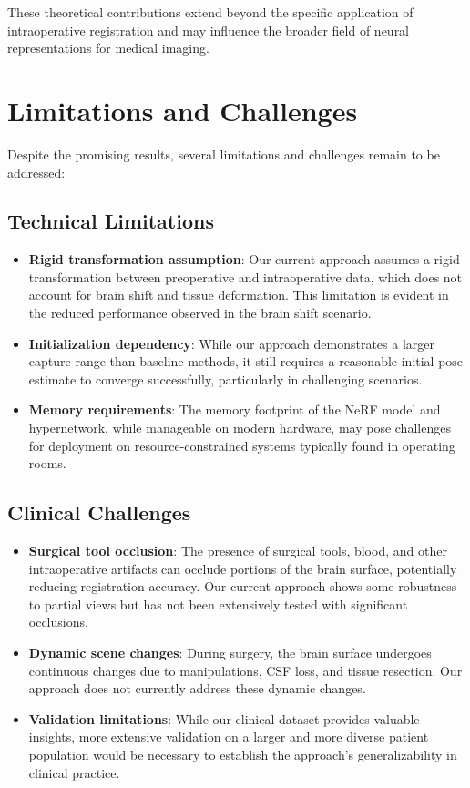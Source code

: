 These theoretical contributions extend beyond the specific application of intraoperative registration and may influence the broader field of neural representations for medical imaging.

\section{Limitations and Challenges}

Despite the promising results, several limitations and challenges remain to be addressed:

\subsection{Technical Limitations}

\begin{itemize}
    \item \textbf{Rigid transformation assumption}: Our current approach assumes a rigid transformation between preoperative and intraoperative data, which does not account for brain shift and tissue deformation. This limitation is evident in the reduced performance observed in the brain shift scenario.
    
    \item \textbf{Initialization dependency}: While our approach demonstrates a larger capture range than baseline methods, it still requires a reasonable initial pose estimate to converge successfully, particularly in challenging scenarios.
    
    \item \textbf{Memory requirements}: The memory footprint of the NeRF model and hypernetwork, while manageable on modern hardware, may pose challenges for deployment on resource-constrained systems typically found in operating rooms.
\end{itemize}

\subsection{Clinical Challenges}

\begin{itemize}
    \item \textbf{Surgical tool occlusion}: The presence of surgical tools, blood, and other intraoperative artifacts can occlude portions of the brain surface, potentially reducing registration accuracy. Our current approach shows some robustness to partial views but has not been extensively tested with significant occlusions.
    
    \item \textbf{Dynamic scene changes}: During surgery, the brain surface undergoes continuous changes due to manipulations, CSF loss, and tissue resection. Our approach does not currently address these dynamic changes.
    
    \item \textbf{Validation limitations}: While our clinical dataset provides valuable insights, more extensive validation on a larger and more diverse patient population would be necessary to establish the approach's generalizability in clinical practice.
\end{itemize}

